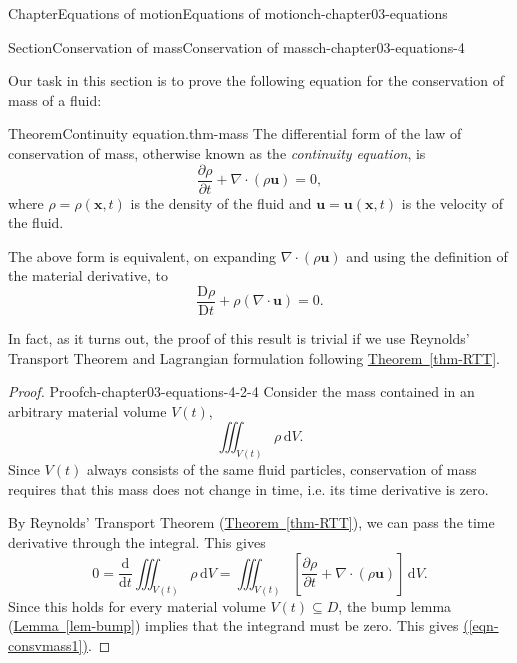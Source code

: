 \documentclass[oneside,10pt,]{book}
\newcommand{\xreffont}{\relax}
\numberwithin{equation}{section}
\newcommand{\de}{\mathrm{d}}
\newcommand{\dd}[2]{\frac{\de#1}{\de#2}}
\newcommand{\DD}[2]{\frac{\mathrm{D}#1}{\mathrm{D}#2}}
\newcommand{\pd}[2]{\frac{\partial#1}{\partial#2}}
\newcommand{\bx}{\boldsymbol{x}}
\newcommand{\bu}{\boldsymbol{u}}
\begin{document}
\begin{chapterptx}{Chapter}{Equations of motion}{}{Equations of motion}{}{}{ch-chapter03-equations}
\typeout{************************************************}
%
\begin{sectionptx}{Section}{Conservation of mass}{}{Conservation of mass}{}{}{ch-chapter03-equations-4}
\begin{introduction}{}%
Our task in this section is to prove the following equation for the conservation of mass of a fluid:%
\begin{theorem}{Theorem}{Continuity equation.}{}{thm-mass}%
The differential form of the law of conservation of mass, otherwise known as the \emph{continuity equation}, is%
\begin{equation}
\pd{\rho}{t} + \nabla \cdot (\rho \bu) = 0,\label{eqn-consvmass1}
\end{equation}
where \(\rho
= \rho(\bx,t)\) is the density of the fluid and \(\bu = \bu(\bx, t)\) is the velocity of the fluid.%
\par
The above form is equivalent, on expanding \(\nabla \cdot (\rho \bu)\) and using the definition of the material derivative, to%
\begin{equation}
\DD{\rho}{t} + \rho(\nabla \cdot \bu) = 0.\label{eqn-consvmass2}
\end{equation}
%
\end{theorem}
In fact, as it turns out, the proof of this result is trivial if we use Reynolds' Transport Theorem and Lagrangian formulation following \hyperref[thm-RTT]{Theorem~{\xreffont\ref{thm-RTT}}}.%
\begin{proof}{Proof}{}{ch-chapter03-equations-4-2-4}
Consider the mass contained in an arbitrary material volume \(V(t)\),%
\begin{equation*}
\iiint_{V(t)} \rho \, \de{V}.
\end{equation*}
Since \(V(t)\) always consists of the same fluid particles, conservation of mass requires that this mass does not change in time, i.e. its time derivative is zero.%
\par
By Reynolds' Transport Theorem (\hyperref[thm-RTT]{Theorem~{\xreffont\ref{thm-RTT}}}), we can pass the time derivative through the integral. This gives%
\begin{equation*}
0 = \dd{}{t}\iiint_{V(t)} \rho \, \de{V} = \iiint_{V(t)} \left[ \pd{\rho}{t} + \nabla
\cdot (\rho \bu)\right] \, \de{V}.
\end{equation*}
Since this holds for every material volume \(V(t) \subseteq D\), the bump lemma (\hyperref[lem-bump]{Lemma~{\xreffont\ref{lem-bump}}}) implies that the integrand must be zero. This gives \hyperref[eqn-consvmass1]{({\xreffont\ref{eqn-consvmass1}})}.%

\end{proof}
\end{introduction}
\end{sectionptx}
\end{chapterptx}
\end{document}
